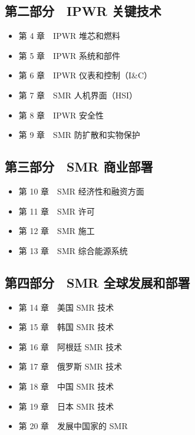 \documentclass[
  UTF8,
  scheme=plain,
  fontsize=10pt,
  openany
]{ctexbook}
\begin{document}
\subsection*{第二部分　IPWR
关键技术}\label{ux7b2cux4e8cux90e8ux5206-ipwr-ux5173ux952eux6280ux672f}

\begin{itemize}
\tightlist
\item
  第 4 章　IPWR 堆芯和燃料
\item
  第 5 章　IPWR 系统和部件
\item
  第 6 章　IPWR 仪表和控制（I\&C）
\item
  第 7 章　SMR 人机界面（HSI）
\item
  第 8 章　IPWR 安全性
\item
  第 9 章　SMR 防扩散和实物保护
\end{itemize}

\subsection*{第三部分　SMR
商业部署}\label{ux7b2cux4e09ux90e8ux5206-smr-ux5546ux4e1aux90e8ux7f72}

\begin{itemize}
\tightlist
\item
  第 10 章　SMR 经济性和融资方面
\item
  第 11 章　SMR 许可
\item
  第 12 章　SMR 施工
\item
  第 13 章　SMR 综合能源系统
\end{itemize}

\subsection*{第四部分　SMR
全球发展和部署}\label{ux7b2cux56dbux90e8ux5206-smr-ux5168ux7403ux53d1ux5c55ux548cux90e8ux7f72}

\begin{itemize}
\tightlist
\item
  第 14 章　美国 SMR 技术
\item
  第 15 章　韩国 SMR 技术
\item
  第 16 章　阿根廷 SMR 技术
\item
  第 17 章　俄罗斯 SMR 技术
\item
  第 18 章　中国 SMR 技术
\item
  第 19 章　日本 SMR 技术
\item
  第 20 章　发展中国家的 SMR
\end{itemize}
\end{document}
